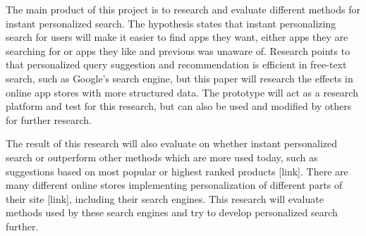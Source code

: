   The main product of this project is to research and evaluate different methods for instant personalized search. The hypothesis states that instant personalizing search for users will make it easier to find apps they want, either apps they are searching for or apps they like and previous was unaware of. Research points to that personalized query suggestion and recommendation is efficient in free-text search, such as Google's search engine, but this paper will research the effects in online app stores with more structured data. The prototype will act as a research platform and test for this research, but can also be used and modified by others for further research.

  The result of this research will also evaluate on whether instant personalized search or outperform other methods which are more used today, such as suggestions based on most popular or highest ranked products [link]. There are many different online stores implementing personalization of different parts of their site [link], including their search engines. This research will evaluate methods used by these search engines and try to develop personalized search further.
  
